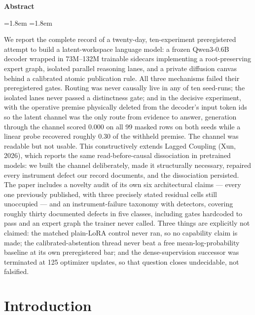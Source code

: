 \documentclass[10pt,a4paper]{article}
\begin{document}
\begin{center}\textbf{Abstract}\end{center}
\begin{list}{}{\leftmargin=1.8em \rightmargin=1.8em}\item\relax
\small
We report the complete record of a twenty-day, ten-experiment preregistered
attempt to build a latent-workspace language model: a frozen Qwen3-0.6B
decoder wrapped in 73M--132M trainable sidecars implementing a root-preserving
expert graph, isolated parallel reasoning lanes, and a private diffusion
canvas behind a calibrated atomic publication rule. All three mechanisms
failed their preregistered gates. Routing was never causally live in any of
ten seed-runs; the isolated lanes never passed a distinctness gate; and in the
decisive experiment, with the operative premise physically deleted from the
decoder's input token ids so the latent channel was the only route from
evidence to answer, generation through the channel scored 0.000 on all 99
masked rows on both seeds while a linear probe recovered roughly 0.30 of the
withheld premise. The channel was readable but not usable. This constructively
extends Lagged Coupling (Xun, 2026), which reports the same read-before-causal
dissociation in pretrained models: we built the channel deliberately, made it
structurally necessary, repaired every instrument defect our record documents,
and the dissociation persisted. The paper includes a novelty audit of its own
six architectural claims --- every one previously published, with three
precisely stated residual cells still unoccupied --- and an instrument-failure
taxonomy with detectors, covering roughly thirty documented defects in five
classes, including gates hardcoded to pass and an expert graph the trainer
never called. Three things are explicitly not claimed: the matched plain-LoRA
control never ran, so no capability claim is made; the calibrated-abstention
thread never beat a free mean-log-probability baseline at its own preregistered
bar; and the dense-supervision successor was terminated at 125 optimizer
updates, so that question closes undecidable, not falsified.
\end{list}
\vspace{0.6em}

\section{Introduction}
\label{sec:intro}
\end{document}
